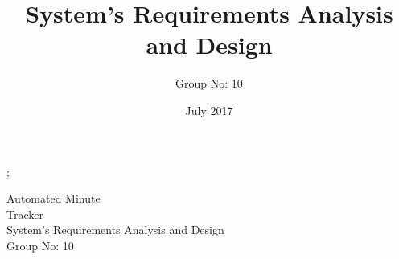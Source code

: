 \documentclass[a4paper,beamer]{article}
\begin{document}
	\title{ System's Requirements Analysis and Design}
	\author{Group No: 10}
	\date{July 2017}

	\bgroup
		;
			
		\begin{adjustwidth}{-1cm}{-1.6cm}
			\textsf{\flushright\vfill\color{white}
				\fontsize{45}{60}\selectfont\textsf{Automated Minute\\ Tracker} \\[.8cm]
				\huge  System's Requirements Analysis and Design \\[.3cm]
				\huge Group No: 10 \\}
		\end{adjustwidth}
	\egroup
	\newpage
	
\end{document}
